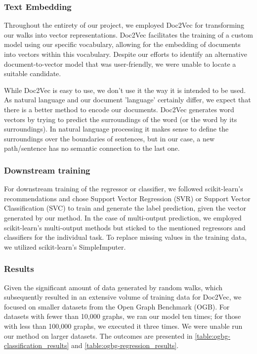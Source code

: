 \subsubsection{Text Embedding}
Throughout the entirety of our project, we employed Doc2Vec\cite{2014doc2vec} for transforming our walks into vector representations. Doc2Vec facilitates the training of a custom model using our specific vocabulary, allowing for the embedding of documents into vectors within this vocabulary. Despite our efforts to identify an alternative document-to-vector model that was user-friendly, we were unable to locate a suitable candidate.

While Doc2Vec is easy to use, we don't use it the way it is intended to be used. As natural language and our document 'language' certainly differ, we expect that there is a better method to encode our documents. Doc2Vec generates word vectors by trying to predict the surroundings of the word (or the word by its surroundings). In natural language processing it makes sense to define the surroundings over the boundaries of sentences, but in our case, a new path/sentence has no semantic connection to the last one.


\subsubsection{Downstream training}
For downstream training of the regressor or classifier, we followed scikit-learn's recommendations and chose Support Vector Regression (SVR) or Support Vector Classification (SVC) to train and generate the label prediction, given the vector generated by our method. In the case of multi-output prediction, we employed scikit-learn's multi-output methods but sticked to the mentioned regressors and classifiers for the individual task. To replace missing values in the training data, we utilized scikit-learn's SimpleImputer.

\subsubsection{Results}
Given the significant amount of data generated by random walks, which subsequently resulted in an extensive volume of training data for Doc2Vec, we focused on smaller datasets from the Open Graph Benchmark (OGB). For datasets with fewer than 10,000 graphs, we ran our model ten times; for those with less than 100,000 graphs, we executed it three times. We were unable run our method on larger datasets. The outcomes are presented in \autoref{table:ogbg-classification_results} and \autoref{table:ogbg-regression_results}.

